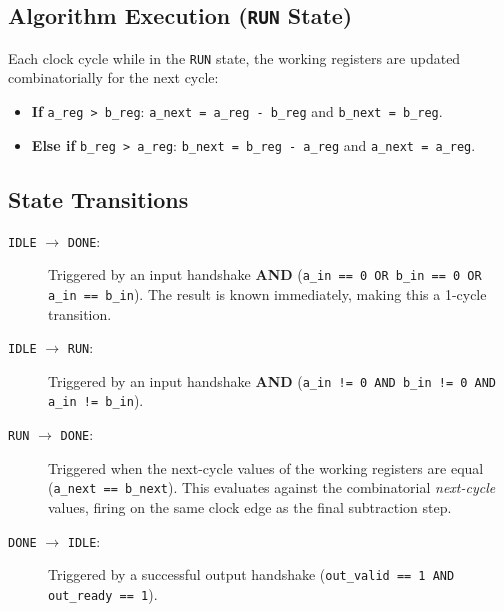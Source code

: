 \subsection*{Algorithm Execution (\texttt{RUN} State)}
Each clock cycle while in the \texttt{RUN} state, the working registers are updated combinatorially for the next cycle:
\begin{itemize}
    \item \textbf{If} \texttt{a\_reg > b\_reg}: \texttt{a\_next = a\_reg - b\_reg} and \texttt{b\_next = b\_reg}.
    \item \textbf{Else if} \texttt{b\_reg > a\_reg}: \texttt{b\_next = b\_reg - a\_reg} and \texttt{a\_next = a\_reg}.
\end{itemize}

\subsection*{State Transitions}
\begin{description}
    \item[\texttt{IDLE} $\rightarrow$ \texttt{DONE}:] Triggered by an input handshake \textbf{AND} (\texttt{a\_in == 0 OR b\_in == 0 OR a\_in == b\_in}). The result is known immediately, making this a 1-cycle transition.
    \item[\texttt{IDLE} $\rightarrow$ \texttt{RUN}:] Triggered by an input handshake \textbf{AND} (\texttt{a\_in != 0 AND b\_in != 0 AND a\_in != b\_in}).
    \item[\texttt{RUN} $\rightarrow$ \texttt{DONE}:] Triggered when the next-cycle values of the working registers are equal (\texttt{a\_next == b\_next}). This evaluates against the combinatorial \textit{next-cycle} values, firing on the same clock edge as the final subtraction step.
    \item[\texttt{DONE} $\rightarrow$ \texttt{IDLE}:] Triggered by a successful output handshake (\texttt{out\_valid == 1 AND out\_ready == 1}).
\end{description}